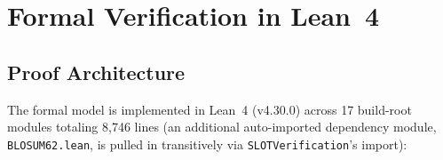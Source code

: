 \documentclass[11pt,a4paper]{article}
\theoremstyle{definition}
\begin{document}
\clearpage
\section{Formal Verification in Lean~4}\label{sec:proofs}

\subsection{Proof Architecture}

The formal model is implemented in Lean~4 (v4.30.0) across 17 build-root modules totaling 8{,}746 lines (an additional auto-imported dependency module, \texttt{BLOSUM62.lean}, is pulled in transitively via \texttt{SLOTVerification}'s import):
\end{document}

